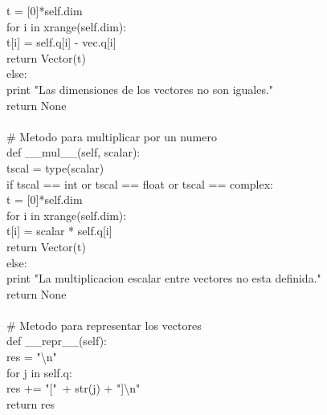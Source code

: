 \documentclass[10pt,letterpaper]{article}
\newenvironment{Code}
{
\begin{lrbox}{\selvestebox}%
\begin{minipage}{\dimexpr\columnwidth-2\fboxsep\relax}
\fontfamily{\ttdefault}\selectfont
}
{\end{minipage}\end{lrbox}%
\begin{center}
\colorbox{light-gray}{\usebox{\selvestebox}}
\end{center}
}
\begin{document}
\begin{scriptsize}
\begin{Code}
\hspace*{17mm} t = [0]*self.dim\\
\hspace*{17mm} for i in xrange(self.dim):\\
\hspace*{23mm} t[i] = self.q[i] - vec.q[i]\\
\hspace*{17mm} return Vector(t)\\
\hspace*{11mm} else:\\
\hspace*{17mm} print "Las dimensiones de los vectores no son iguales."\\
\hspace*{17mm} return None\\
\\
\hspace*{5mm} \# Metodo para multiplicar por un numero\\
\hspace*{5mm} def \_\_mul\_\_(self, scalar):\\
\hspace*{11mm} tscal = type(scalar)\\
\hspace*{11mm} if tscal == int or tscal == float or tscal == complex:\\
\hspace*{17mm} t = [0]*self.dim\\
\hspace*{17mm} for i in xrange(self.dim):\\
\hspace*{23mm} t[i] = scalar * self.q[i]\\
\hspace*{17mm} return Vector(t)\\
\hspace*{11mm} else:\\
\hspace*{17mm} print "La multiplicacion escalar entre vectores no esta definida."\\
\hspace*{17mm} return None\\
\\
\hspace*{5mm} \# Metodo para representar los vectores\\
\hspace*{5mm} def \_\_repr\_\_(self):\\
\hspace*{11mm} res = "\textbackslash n"\\
\hspace*{11mm} for j in self.q:\\
\hspace*{17mm} res += "["\ + str(j) + "]\textbackslash n"\\
\hspace*{11mm} return res
\end{Code}
\end{scriptsize}
\end{document}
